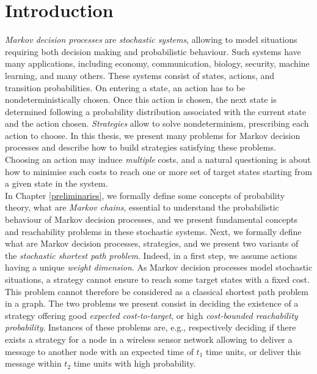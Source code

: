 \chapter*{Introduction}

\textit{Markov decision processes} are \textit{stochastic systems}, allowing to model situations requiring both decision making and probabilistic behaviour.
Such systems have many applications, including economy, communication, biology, security, machine learning, and many others.
These systems consist of states, actions, and transition probabilities.
On entering a state, an action has to be nondeterministically chosen.
Once this action is chosen, the next state is determined following a probability distribution associated with the current state and the action chosen.
\textit{Strategies} allow to solve nondeterminism, prescribing each action to choose.
In this thesis, we present many problems for Markov decision processes and describe how to build strategies satisfying these problems.
Choosing an action may induce \textit{multiple} costs, and a natural questioning is about how to minimise such costs to reach one or more set of target states starting from a given state in the system. \\

In Chapter \ref{preliminaries}, we formally define some concepts of probability theory, what are \textit{Markov chains}, essential to understand the probabilistic behaviour of Markov decision processes, and we present fundamental concepts and reachability problems in these stochastic systems.
Next, we formally define what are Markov decision processes, strategies, and we present
 two variants of the \textit{stochastic shortest path problem}.
 Indeed, in a first step, we assume actions having a unique \textit{weight dimension}.
As Markov decision processes model stochastic situations, a strategy cannot ensure to reach some target states with a fixed cost.
This problem cannot therefore be considered as a classical shortest path problem in a graph.
The two problems we present consist in deciding the existence of a strategy offering good \textit{expected cost-to-target}, or high \textit{cost-bounded reachability probability}.
Instances of these problems are, e.g., respectively deciding if there exists a strategy for a node in a wireless sensor network allowing to deliver a message to another node with an expected time of $t_1$ time units, or deliver this message within $t_2$ time units with high probability.\\

